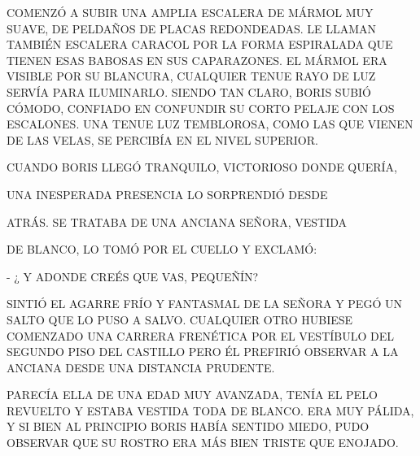 
\newpage
{}
COMENZÓ A SUBIR UNA AMPLIA ESCALERA DE MÁRMOL MUY SUAVE, DE PELDAÑOS DE PLACAS REDONDEADAS.  LE LLAMAN TAMBIÉN ESCALERA CARACOL POR LA FORMA ESPIRALADA QUE TIENEN ESAS BABOSAS EN SUS CAPARAZONES. EL MÁRMOL ERA VISIBLE POR SU BLANCURA, CUALQUIER TENUE RAYO DE LUZ SERVÍA PARA ILUMINARLO. SIENDO TAN CLARO, BORIS SUBIÓ CÓMODO, CONFIADO EN CONFUNDIR SU CORTO PELAJE CON LOS ESCALONES.
UNA TENUE LUZ TEMBLOROSA, COMO LAS QUE VIENEN DE LAS VELAS, SE PERCIBÍA EN EL NIVEL SUPERIOR.

CUANDO BORIS LLEGÓ TRANQUILO, VICTORIOSO DONDE QUERÍA,

\begin{flushright}
	UNA INESPERADA PRESENCIA  LO SORPRENDIÓ  DESDE 
	
	ATRÁS. 
	SE TRATABA DE UNA ANCIANA SEÑORA,  
	VESTIDA 
	
	DE 
	BLANCO,    LO TOMÓ POR 
	EL  
	CUELLO Y EXCLAMÓ:
	
	- ¿ Y ADONDE CREÉS QUE VAS, PEQUEÑÍN? 	
\end{flushright}
\newpage
{}
SINTIÓ EL AGARRE FRÍO Y FANTASMAL DE LA SEÑORA Y PEGÓ UN SALTO QUE LO PUSO A SALVO. CUALQUIER OTRO HUBIESE COMENZADO UNA CARRERA FRENÉTICA POR EL VESTÍBULO DEL SEGUNDO PISO DEL CASTILLO PERO ÉL PREFIRIÓ OBSERVAR A LA ANCIANA DESDE UNA DISTANCIA PRUDENTE.

PARECÍA ELLA DE UNA EDAD MUY AVANZADA, TENÍA EL PELO REVUELTO Y ESTABA VESTIDA TODA DE BLANCO. ERA MUY PÁLIDA, Y SI BIEN AL PRINCIPIO BORIS HABÍA SENTIDO MIEDO, PUDO OBSERVAR QUE SU ROSTRO ERA MÁS BIEN TRISTE QUE ENOJADO.

